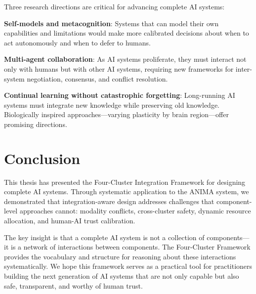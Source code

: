 \documentclass[11pt,a4paper]{article}
\begin{document}
Three research directions are critical for advancing complete AI systems:

\textbf{Self-models and metacognition}: Systems that can model their own capabilities and limitations would make more calibrated decisions about when to act autonomously and when to defer to humans.

\textbf{Multi-agent collaboration}: As AI systems proliferate, they must interact not only with humans but with other AI systems, requiring new frameworks for inter-system negotiation, consensus, and conflict resolution.

\textbf{Continual learning without catastrophic forgetting}: Long-running AI systems must integrate new knowledge while preserving old knowledge. Biologically inspired approaches---varying plasticity by brain region---offer promising directions.

\section{Conclusion}

This thesis has presented the Four-Cluster Integration Framework for designing complete AI systems. Through systematic application to the ANIMA system, we demonstrated that integration-aware design addresses challenges that component-level approaches cannot: modality conflicts, cross-cluster safety, dynamic resource allocation, and human-AI trust calibration.

The key insight is that a complete AI system is not a collection of components---it is a network of interactions between components. The Four-Cluster Framework provides the vocabulary and structure for reasoning about these interactions systematically. We hope this framework serves as a practical tool for practitioners building the next generation of AI systems that are not only capable but also safe, transparent, and worthy of human trust.
\end{document}
